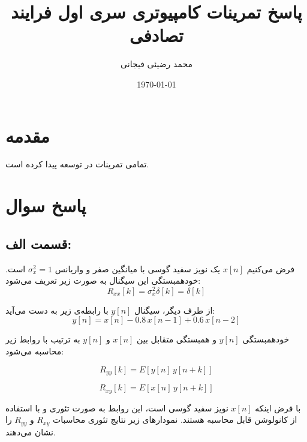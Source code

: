 \documentclass[12pt,onecolumn,a4paper]{article}
\author{
	محمد رضیئی فیجانی
}
\title{
	پاسخ تمرینات کامپیوتری سری اول فرایند تصادفی
}
\date{\today}
\newcommand\question{
	\section{پاسخ سوال \tartibi{section}}
}
\begin{document}
	
	
	\pagestyle{fancy}
	\maketitle
	
	\section*{مقدمه}
	تمامی تمرینات در 
	\cite{matlab2024a}
	توسعه پیدا کرده است.
	
	\FloatBarrier
	\question%
	
	\FloatBarrier
	\subsection{قسمت الف:}
	
	فرض می‌کنیم \( x[n] \) یک نویز سفید گوسی با میانگین صفر و واریانس \( \sigma_x^2 = 1 \) است. خودهمبستگی این سیگنال به صورت زیر تعریف می‌شود:
	\begin{equation}
		R_{xx}[k] = \sigma_x^2 \delta[k] = \delta[k]
	\end{equation}
	
	
	از طرف دیگر، سیگنال \( y[n] \) با رابطه‌ی زیر به دست می‌آید:
	\begin{equation}
		y[n] = x[n] - 0.8 \, x[n-1] + 0.6 \, x[n-2]
	\end{equation}
	
	خودهمبستگی \( y[n] \) و همبستگی متقابل بین \( x[n] \) و \( y[n] \) به ترتیب با روابط زیر محاسبه می‌شود:
	
	\begin{equation}
		R_{yy}[k] = E[y[n] \, y[n+k]]
	\end{equation}
	
	\begin{equation}
		R_{xy}[k] = E[x[n] \, y[n+k]]
	\end{equation}
	
	با فرض اینکه \( x[n] \) نویز سفید گوسی است، این روابط به صورت تئوری و با استفاده از کانولوشن قابل محاسبه هستند. نمودارهای زیر نتایج تئوری محاسبات \( R_{xy} \) و \( R_{yy} \) را نشان می‌دهند.
	
\end{document}

